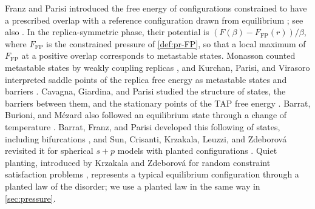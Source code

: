 Franz and Parisi introduced the free energy of configurations constrained to have a prescribed overlap with a reference configuration drawn from equilibrium \cite{FranzParisi1995}; see also \cite{FranzParisi1997}. In the replica-symmetric phase, their potential is $(F(\beta)-F_{\mathrm{FP}}(r))/\beta$, where $F_{\mathrm{FP}}$ is the constrained pressure of \cref{def:pr-FP}, so that a local maximum of $F_{\mathrm{FP}}$ at a positive overlap corresponds to metastable states. Monasson counted metastable states by weakly coupling replicas \cite{Monasson1995}, and Kurchan, Parisi, and Virasoro interpreted saddle points of the replica free energy as metastable states and barriers \cite{KurchanParisiVirasoro1993}. Cavagna, Giardina, and Parisi studied the structure of states, the barriers between them, and the stationary points of the TAP free energy \cite{CavagnaGiardinaParisi1997a,CavagnaGiardinaParisi1997b,CavagnaGiardinaParisi1998}. Barrat, Burioni, and M\'ezard also followed an equilibrium state through a change of temperature \cite{BarratBurioniMezard1996}. Barrat, Franz, and Parisi developed this following of states, including bifurcations \cite{BarratFranzParisi1997}, and Sun, Crisanti, Krzakala, Leuzzi, and Zdeborov\'a revisited it for spherical $s+p$ models with planted configurations \cite{SunCrisantiKrzakalaLeuzziZdeborova2012}. Quiet planting, introduced by Krzakala and Zdeborov\'a for random constraint satisfaction problems \cite{KrzakalaZdeborova2009}, represents a typical equilibrium configuration through a planted law of the disorder; we use a planted law in the same way in \cref{sec:pressure}.

